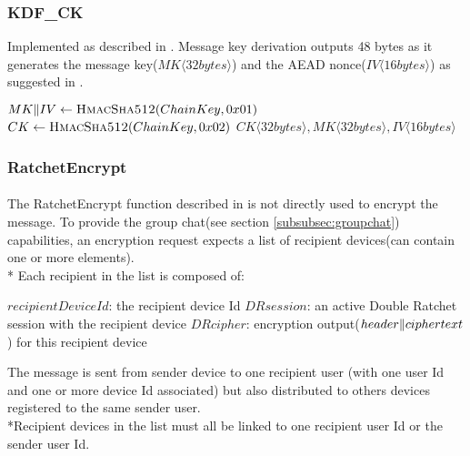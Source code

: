 \documentclass[a4paper,11pt]{article}
\begin{document}
    \subsubsection{KDF\_CK}
      \label{subsubsec:kdfck}
      Implemented as described in \cite[section 5.2]{doubleRatchet}. Message key derivation outputs 48 bytes as it generates the message key($MK\langle 32bytes\rangle$) and the AEAD nonce($IV\langle 16 bytes\rangle$) as suggested in \cite[section 3.1 - ENCRYPT]{doubleRatchet}.
      \begin{algorithmic}
          \State $MK\Arrowvert IV \gets \Call{HmacSha512}{ChainKey, 0x01}$
          \State $CK \gets \Call{HmacSha512}{ChainKey, 0x02}$
          \State \Return $CK\langle 32bytes\rangle ,MK\langle 32bytes\rangle ,IV\langle 16 bytes\rangle $
        \EndFunction
      \end{algorithmic}

    \subsubsection{RatchetEncrypt}
      \paragraph{}The RatchetEncrypt function described in \cite[section 3.4]{doubleRatchet} is not directly used to encrypt the message. To provide the group chat(see section \ref{subsubsec:groupchat}) capabilities, an encryption request expects a list of recipient devices(can contain one or more elements).\\*
      Each recipient in the list is composed of:
        \begin{algorithmic}
          \State $recipientDeviceId$: the recipient device Id
          \State $DRsession$: an active Double Ratchet session with the recipient device
          \State $DRcipher$: encryption output($header\Arrowvert ciphertext$) for this recipient device
        \end{algorithmic}
      The message is sent from sender device to one recipient user (with one user Id and one or more device Id associated) but also distributed to others devices registered to the same sender user.
      \\*Recipient devices in the list must all be linked to one recipient user Id or the sender user Id.
      
\end{document}
